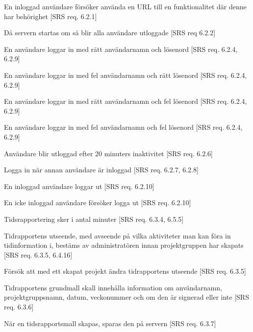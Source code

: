 \documentclass[a4paper]{article}
\begin{document}
\begin{appendices}
\begin{FT}
\item
En inloggad användare försöker använda en URL till en funktionalitet där denne har behörighet [SRS req. 6.2.1]

\item
Då servern startas om så blir alla användare utloggade [SRS req 6.2.2]

\item
En användare loggar in med rätt användarnamn och lösenord [SRS req. 6.2.4, 6.2.9]

\item
En användare loggar in med fel användarnamn och rätt lösenord [SRS req. 6.2.4, 6.2.9]

\item
En användare loggar in med rätt användarnamn och fel lösenord [SRS req. 6.2.4, 6.2.9]

\item
En användare loggar in med fel användarnamn och fel lösenord [SRS req. 6.2.4, 6.2.9]

\item 
Användare blir utloggad efter 20 minuters inaktivitet [SRS req. 6.2.6]

\item 
Logga in när annan användare är inloggad [SRS req. 6.2.7, 6.2.8]

\item
En inloggad användare loggar ut [SRS req. 6.2.10]

\item
En icke inloggad användare försöker logga ut [SRS req. 6.2.10]

\item
Tidsrapportering sker i antal minuter [SRS req. 6.3.4, 6.5.5]

\item
Tidrapportens utseende, med avseende på vilka aktiviteter man kan föra in tidinformation i, bestäms av administratören innan projektgruppen har skapats [SRS req. 6.3.5, 6.4.16]

\item
Försök att med ett skapat projekt ändra tidrapportens utseende [SRS req. 6.3.5]

\item
Tidrapportens grundmall skall innehålla information om användarnamn, projektgruppsnamn, datum, veckonummer och om den är signerad eller inte [SRS req. 6.3.6]

\item
När en tidsrapportsmall skapas, sparas den på servern [SRS req. 6.3.7]


\end{FT}
\end{appendices}
\end{document}
